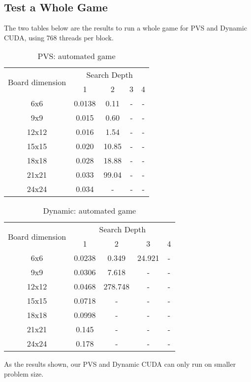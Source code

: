\subsection{Test a Whole Game}
The two tables below are the results to run a whole game for PVS and Dynamic CUDA, using 768 threads per block.\\

\begin{table}[!htbp]
\centering
\begin{tabular}{|c|c|c|c|c|} 
\hline
\multirow{2}{*}{Board dimension} & \multicolumn{4}{c|}{Search Depth}     \\ 
\cline{2-5}
                                 & 1       & 2      & 3       & 4        \\ 
\hline
6x6                              & 0.0138  & 0.11  & -  & -    \\ 
\hline
9x9                              & 0.015   & 0.60  & -  & -   \\ 
\hline
12x12                            & 0.016   & 1.54  & -  & -  \\ 
\hline
15x15                            & 0.020   & 10.85 & - & -        \\ 
\hline
18x18                            & 0.028   & 18.88 & -  & -        \\ 
\hline
21x21                            & 0.033   & 99.04 & -  & -        \\ 
\hline
24x24                            & 0.034   & -     & - & -        \\
\hline
\end{tabular}
\caption{PVS: automated game}
\end{table}

\begin{table}[!htbp]
\centering
\begin{tabular}{|c|c|c|c|c|} 
\hline
\multirow{2}{*}{Board dimension} & \multicolumn{4}{c|}{Search Depth}     \\ 
\cline{2-5}
                                 & 1       & 2      & 3       & 4        \\ 
\hline
6x6                              & 0.0238  & 0.349  & 24.921  & -    \\ 
\hline
9x9                              & 0.0306   & 7.618  & -  & -   \\ 
\hline
12x12                            & 0.0468   & 278.748  & -  & -  \\ 
\hline
15x15                            & 0.0718   & - & - & -        \\ 
\hline
18x18                            & 0.0998   & - & -  & -        \\ 
\hline
21x21                            & 0.145   & - & -  & -        \\ 
\hline
24x24                            & 0.178   & -     & - & -        \\
\hline
\end{tabular}
\caption{Dynamic: automated game}
\end{table}

\noindent
As the results shown, our PVS and Dynamic CUDA can only run on smaller problem size. 